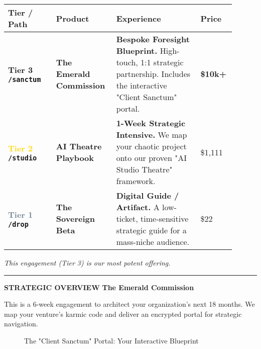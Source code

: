 \documentclass[11pt, a4paper]{article}
\newcommand{\decksection}[1]{
    \par
    \vspace{0.7cm}
    \textcolor{Emerald}{\rule{\linewidth}{1pt}}
    \vspace{0.2cm}
    \noindent\textcolor{Emerald}{\fontsize{10}{12}\selectfont\textbf{STRATEGIC OVERVIEW}}
    \noindent\fontsize{24}{28}\selectfont\textbf{#1}
    \vspace{0.5cm}
}
\begin{document}
\begin{table}[h!]
\renewcommand{\arraystretch}{1.5}
\begin{tabular}{>{\bfseries}p{0.2\linewidth} p{0.25\linewidth} p{0.35\linewidth} p{0.1\linewidth}}
\toprule
\textbf{Tier / Path} & \textbf{Product} & \textbf{Experience} & \textbf{Price} \\
\midrule
\textcolor{Emerald}{\textbf{Tier 3}} \newline \texttt{/sanctum} & \textbf{The Emerald Commission} & \textbf{Bespoke Foresight Blueprint.} \newline High-touch, 1:1 strategic partnership. Includes the interactive "Client Sanctum" portal. & \textbf{\$10k+} \\
\addlinespace
\textcolor{Gold}{\textbf{Tier 2}} \newline \texttt{/studio} & \textbf{AI Theatre Playbook} & \textbf{1-Week Strategic Intensive.} \newline We map your chaotic project onto our proven "AI Studio Theatre" framework. & \$1,111 \\
\addlinespace
\textcolor{SlateGrey}{\textbf{Tier 1}} \newline \texttt{/drop} & \textbf{The Sovereign Beta} & \textbf{Digital Guide / Artifact.} \newline A low-ticket, time-sensitive strategic guide for a mass-niche audience. & \$22 \\
\bottomrule
\end{tabular}
\end{table}

\vspace{0.5cm}
\centerline{\textit{This engagement (Tier 3) is our most potent offering.}}

\newpage

\decksection{The Emerald Commission}
This is a 6-week engagement to architect your organization's next 18 months. We map your venture's karmic code and deliver an encrypted portal for strategic navigation.

\begin{figure}[htbp]
  \centering
  \caption{The "Client Sanctum" Portal: Your Interactive Blueprint}
\end{figure}
\end{document}
